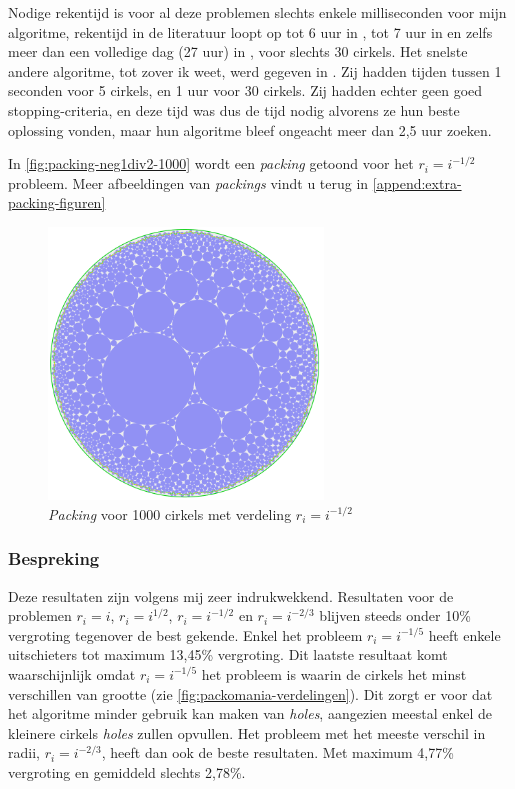 \documentclass[12pt,a4paper,oneside]{book}
\begin{document}
Nodige rekentijd is voor al deze problemen slechts enkele milliseconden voor mijn algoritme, rekentijd in de literatuur loopt op tot 6 uur in \cite{jors2011}, tot 7 uur in \cite{lopez2013packing} en zelfs meer dan een volledige dag (27 uur) in \cite{zeng2016iterated}, voor slechts 30 cirkels.
Het snelste andere algoritme, tot zover ik weet, werd gegeven in \cite{ye2013iterated}.
Zij hadden tijden tussen 1 seconden voor 5 cirkels, en 1 uur voor 30 cirkels.
Zij hadden echter geen goed stopping-criteria, en deze tijd was dus de tijd nodig alvorens ze hun beste oplossing vonden, maar hun algoritme bleef ongeacht meer dan 2,5 uur zoeken.

In \autoref{fig:packing-neg1div2-1000} wordt een \textit{packing} getoond voor het $r_i = i^{-1/2}$ probleem.
Meer afbeeldingen van \textit{packings} vindt u terug in \autoref{append:extra-packing-figuren}

\begin{figure}
  \centering
  \includegraphics[width=0.65\textwidth]{packing-neg1div2-1000.png}
  \caption{\textit{Packing} voor 1000 cirkels met verdeling $r_i=i^{-1/2}$} \label{fig:packing-neg1div2-1000} 
\end{figure}

\subsubsection{Bespreking}

Deze resultaten zijn volgens mij zeer indrukwekkend.
Resultaten voor de problemen $r_i = i$, $r_i = i^{1/2}$, $r_i = i^{-1/2}$ en $r_i = i^{-2/3}$ blijven steeds onder 10\% vergroting tegenover de best gekende.
Enkel het probleem $r_i = i^{-1/5}$ heeft enkele uitschieters tot maximum 13,45\% vergroting.
Dit laatste resultaat komt waarschijnlijk omdat $r_i = i^{-1/5}$ het probleem is waarin de cirkels het minst verschillen van grootte (zie \autoref{fig:packomania-verdelingen}).
Dit zorgt er voor dat het algoritme minder gebruik kan maken van \textit{holes}, aangezien meestal enkel de kleinere cirkels \textit{holes} zullen opvullen.
Het probleem met het meeste verschil in radii, $r_i = i^{-2/3}$, heeft dan ook de beste resultaten.
Met maximum 4,77\% vergroting en gemiddeld slechts 2,78\%.
\end{document}
